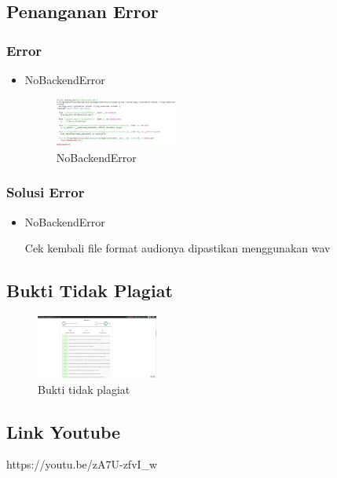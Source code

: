 \subsection{Penanganan Error}
\subsubsection{Error}
\hfill\break
\begin{itemize}
\item NoBackendError

\begin{figure}[H]
\centering
	\includegraphics[width=4cm]{figures/1174066/6/error1.jpg}
\caption{NoBackendError}
\end{figure}
\end{itemize}
\subsubsection{Solusi Error}
\hfill\break
\begin{itemize}
\item NoBackendError

Cek kembali file format audionya dipastikan menggunakan wav
\end{itemize}

\subsection{Bukti Tidak Plagiat}
\begin{figure}[H]
	\includegraphics[width=4cm]{figures/1174066/6/buktiplagiat.jpg}
	\centering
	\caption{Bukti tidak plagiat}
\end{figure}

\subsection{Link Youtube}
https://youtu.be/zA7U-zfvI\_w